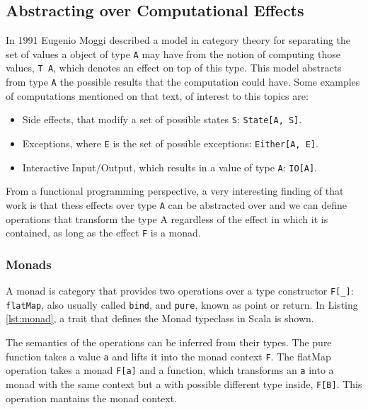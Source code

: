 \documentclass[../main.tex]{subfiles}
\begin{document}
\subsection{Abstracting over Computational Effects}
In 1991 Eugenio Moggi \autocite{MoggiNotionsMonads} described a model
in category theory for separating the set of values a object of type \texttt{A} may have from
the notion of computing those values, \texttt{T A}, which denotes an effect on top of
this type. This model abstracts from type \texttt{A} the possible
results that the computation could have. Some examples of computations mentioned
on that text, of interest to this topics are:

\begin{itemize}
\item Side effects, that modify a set of possible states \texttt{S}: \texttt{State[A, S]}.
\item Exceptions, where \texttt{E} is the set of possible exceptions: \texttt{Either[A, E]}.
\item Interactive Input/Output, which results in a value of type \texttt{A}: \texttt{IO[A]}.
\end{itemize}

From a functional programming perspective, a very interesting finding of that
work is that thess effects over type \texttt{A} can be abstracted over and we can define
operations that transform the type A regardless of the effect in which it is
contained, as long as the effect \texttt{F} is a monad.

\subsubsection{Monads}
A monad is category that provides two operations over a type constructor
\texttt{F[\_]}: \texttt{flatMap}, also usually called \texttt{bind}, and \texttt{pure},
known as point or return. In Listing \ref{lst:monad}, a trait that defines the
Monad typeclass in Scala is shown.



The semantics of the operations can be inferred from their types.
The pure function takes a value \texttt{a} and lifts it into the monad context
\texttt{F}. The flatMap operation takes a monad \texttt{F[a]} and a function,
which transforms an \texttt{a} into a monad with the same context but a with possible
different type inside, \texttt{F[B]}. This operation mantains the monad context.
\end{document}
